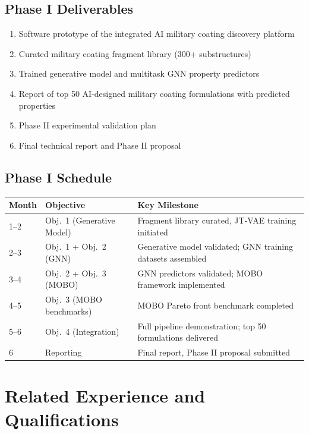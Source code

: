 \documentclass[11pt,letterpaper]{article}
\begin{document}
\subsection{Phase I Deliverables}

\begin{enumerate}[nosep]
  \item Software prototype of the integrated AI military coating discovery platform
  \item Curated military coating fragment library (300+ substructures)
  \item Trained generative model and multitask GNN property predictors
  \item Report of top 50 AI-designed military coating formulations with predicted properties
  \item Phase II experimental validation plan
  \item Final technical report and Phase II proposal
\end{enumerate}

\subsection{Phase I Schedule}

\begin{center}
\begin{tabular}{lll}
\toprule
\textbf{Month} & \textbf{Objective} & \textbf{Key Milestone} \\
\midrule
1--2 & Obj.\ 1 (Generative Model) & Fragment library curated, JT-VAE training initiated \\
2--3 & Obj.\ 1 + Obj.\ 2 (GNN) & Generative model validated; GNN training datasets assembled \\
3--4 & Obj.\ 2 + Obj.\ 3 (MOBO) & GNN predictors validated; MOBO framework implemented \\
4--5 & Obj.\ 3 (MOBO benchmarks) & MOBO Pareto front benchmark completed \\
5--6 & Obj.\ 4 (Integration) & Full pipeline demonstration; top 50 formulations delivered \\
6 & Reporting & Final report, Phase II proposal submitted \\
\bottomrule
\end{tabular}
\end{center}


\section{Related Experience and Qualifications}
\label{sec:qualifications}
\end{document}
